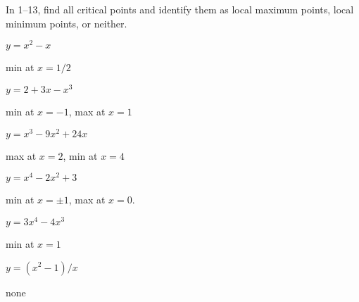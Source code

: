 \begin{solution}
\end{solution}

\begin{exercises}
In 1--13,
find all critical points and identify them as
local maximum points, local minimum points, or neither.

\twocol

\begin{exercise} $y=x^2-x$ 
\begin{answer} min at $x=1/2$
\end{answer}\end{exercise}

\begin{exercise} $y=2+3x-x^3$ 
\begin{answer} min at $x=-1$, max at $x=1$
\end{answer}\end{exercise}

\begin{exercise} $y=x^3-9x^2+24x$
\begin{answer} max at $x=2$, min at $x=4$
\end{answer}\end{exercise}

\begin{exercise} $y=x^4-2x^2+3$ 
\begin{answer} min at $x=\pm 1$, max at $x=0$.
\end{answer}\end{exercise}

\begin{exercise} $y=3x^4-4x^3$
\begin{answer} min at $x=1$
\end{answer}\end{exercise}

\begin{exercise} $y=(x^2-1)/x$
\begin{answer} none
\end{answer}\end{exercise}


\end{exercises}
